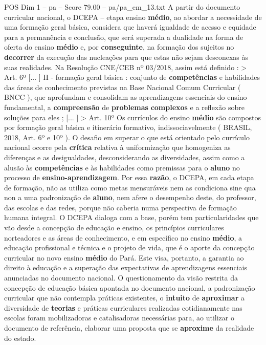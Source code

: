 \begin{textsample}{POS Dim 1 – pa – Score 79.00 – pa/pa\_em\_13.txt}
A partir do documento curricular nacional, o DCEPA – etapa ensino \textbf{médio}, ao abordar a necessidade de uma formação geral básica, considera que haverá igualdade de acesso e equidade para a permanência e conclusão, que será superada a dualidade na forma de oferta do ensino \textbf{médio} e, por \textbf{conseguinte}, na formação dos sujeitos no \textbf{decorrer} da execução das nucleações para que estas não sejam desconexas às suas realidades.
Na Resolução CNE/CEB nº 03/2018, assim está definido : > Art. 6º [... ] II - formação geral básica : conjunto de \textbf{competências} e habilidades das áreas de conhecimento previstas na Base Nacional Comum Curricular ( BNCC ), que aprofundam e consolidam as aprendizagens essenciais do ensino fundamental, a \textbf{compreensão} de \textbf{problemas} \textbf{complexos} e a reflexão sobre soluções para eles ; [... ] > Art. 10º Os currículos do ensino \textbf{médio} são compostos por formação geral básica e itinerário formativo, indissociavelmente ( BRASIL, 2018, Art. 6º e 10º ).
O desafio em superar o que está orientado pelo currículo nacional ocorre pela \textbf{crítica} relativa à uniformização que homogeniza as diferenças e as desigualdades, desconsiderando as diversidades, assim como a alusão às \textbf{competências} e às habilidades como premissas para o \textbf{aluno} no processo de \textbf{ensino-aprendizagem}.
Por essa \textbf{razão}, o DCEPA, em cada etapa de formação, não as utiliza como metas mensuráveis nem as condiciona sine qua non a uma padronização de \textbf{aluno}, nem afere o desempenho deste, do professor, das escolas e das redes, porque não caberia numa perspectiva de formação humana integral.
O DCEPA dialoga com a base, porém tem particularidades que vão desde a concepção de educação e ensino, os princípios curriculares norteadores e as áreas de conhecimento, e em específico no ensino \textbf{médio}, a educação profissional e técnica e o projeto de vida, que é o aporte da concepção curricular no novo ensino \textbf{médio} do Pará.
Este visa, portanto, a garantia ao direito à educação e a superação das expectativas de aprendizagens essenciais anunciadas no documento nacional.
O questionamento da visão restrita da concepção de educação básica apontada no documento nacional, a padronização curricular que não contempla práticas existentes, o \textbf{intuito} de \textbf{aproximar} a diversidade de \textbf{teorias} e práticas curriculares realizadas cotidianamente nas escolas foram mobilizadoras e catalisadoras necessárias para, ao utilizar o documento de referência, elaborar uma proposta que se \textbf{aproxime} da realidade do estado.

\end{textsample}
